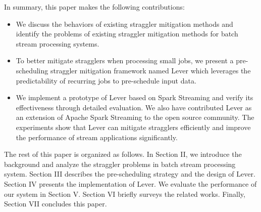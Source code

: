   In summary, this paper makes the following contributions:
\begin{itemize}
  \item We discuss the behaviors of existing straggler mitigation methods and identify the problems of existing straggler mitigation methods for batch stream processing systems.

  \item To better mitigate stragglers when processing small jobs, we present a pre-scheduling straggler mitigation framework named Lever which leverages the predictability of recurring jobs to pre-schedule input data.

  \item We implement a prototype of Lever based on Spark Streaming and verify its effectiveness through detailed evaluation. We also have contributed Lever as an extension of Apache Spark Streaming to the open source community. The experiments show that Lever can mitigate stragglers efficiently and improve the performance of stream applications significantly.
\end{itemize}

  The rest of this paper is organized as follows. In Section II, we introduce the background and analyze the straggler problems in batch stream processing system. Section III describes the pre-scheduling strategy and the design of Lever. Section IV presents the implementation of Lever. We evaluate the performance of our system in Section V. Section VI briefly surveys the related works. Finally, Section VII concludes this paper.
